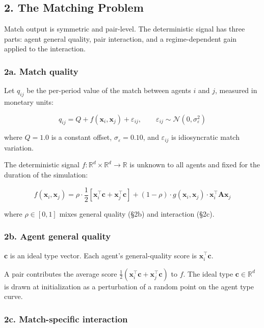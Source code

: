 \documentclass[11pt]{article}
\begin{document}
\subsection{2. The Matching Problem}\label{the-matching-problem}

Match output is symmetric and pair-level. The deterministic signal has three parts: agent general quality, pair interaction, and a regime-dependent gain applied to the interaction.

\subsubsection{2a. Match quality}\label{a.-match-quality}

Let \(q_{ij}\) be the per-period value of the match between agents \(i\) and \(j\), measured in monetary units:

\[q_{ij} = Q + f(\mathbf{x}_i, \mathbf{x}_j) + \varepsilon_{ij}, \qquad
\varepsilon_{ij} \sim \mathcal{N}(0, \sigma_\varepsilon^2)\]

where \(Q = 1.0\) is a constant offset, \(\sigma_\varepsilon = 0.10\), and \(\varepsilon_{ij}\) is idiosyncratic match variation.

The deterministic signal \(f: \mathbb{R}^d \times \mathbb{R}^d \to \mathbb{R}\) is unknown to all agents and fixed for the duration of the simulation:

\[f(\mathbf{x}_i, \mathbf{x}_j) = \rho \cdot \frac{1}{2}\!\left[\mathbf{x}_i^\top \mathbf{c} + \mathbf{x}_j^\top \mathbf{c}\right] + (1 - \rho) \cdot g(\mathbf{x}_i, \mathbf{x}_j) \cdot \mathbf{x}_i^\top \mathbf{A} \mathbf{x}_j\]

where \(\rho \in [0,1]\) mixes general quality (§2b) and interaction (§2c).

\subsubsection{2b. Agent general quality}\label{b.-agent-general-quality}

\(\mathbf{c}\) is an ideal type vector. Each agent's general-quality score is \(\mathbf{x}_i^\top\mathbf{c}\).

A pair contributes the average score \(\frac{1}{2}(\mathbf{x}_i^\top\mathbf{c}+\mathbf{x}_j^\top\mathbf{c})\) to \(f\). The ideal type \(\mathbf{c}\in\mathbb{R}^d\) is drawn at initialization as a perturbation of a random point on the agent type curve.

\subsubsection{2c. Match-specific interaction}\label{c.-match-specific-interaction}
\end{document}
